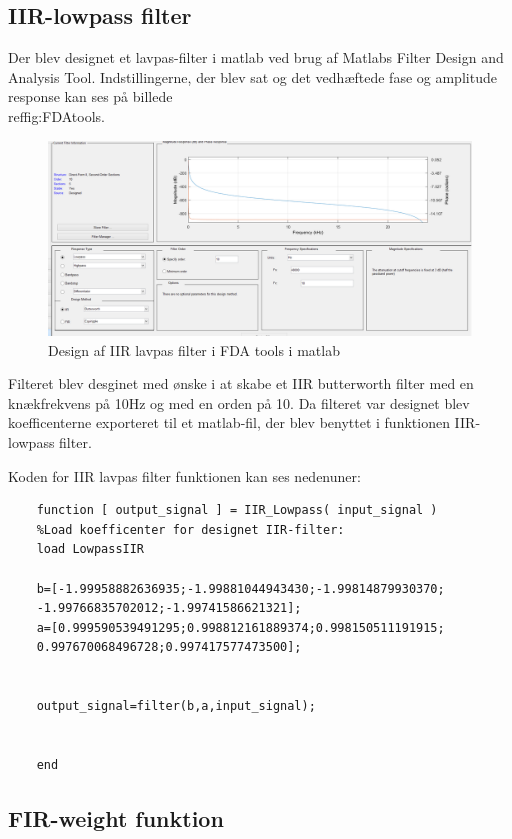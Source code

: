 \subsection{IIR-lowpass filter}
Der blev designet et lavpas-filter i matlab ved brug af Matlabs Filter Design and Analysis Tool. Indstillingerne, der blev sat og det vedhæftede fase og amplitude response kan ses på billede \\ref{fig:FDAtools}.

\begin{figure}[H]
	\centering
	\includegraphics[width=150mm]{figures/FDATool.PNG}
	\caption{Design af IIR lavpas filter i FDA tools i matlab}
	\label{fig:FDAtools}
\end{figure}

Filteret blev desginet med ønske i at skabe et IIR butterworth filter med en knækfrekvens på 10Hz og med en orden på 10. 
Da filteret var designet blev koefficenterne exporteret til et matlab-fil, der blev benyttet i funktionen IIR-lowpass filter.

Koden for IIR lavpas filter funktionen kan ses nedenuner:
    \begin{verbatim}
    function [ output_signal ] = IIR_Lowpass( input_signal )
    %Load koefficenter for designet IIR-filter:
    load LowpassIIR
    
    b=[-1.99958882636935;-1.99881044943430;-1.99814879930370;
    -1.99766835702012;-1.99741586621321];
    a=[0.999590539491295;0.998812161889374;0.998150511191915;
    0.997670068496728;0.997417577473500];
    
    
    output_signal=filter(b,a,input_signal);
    
    
    end
    \end{verbatim}

\subsection{FIR-weight funktion}

